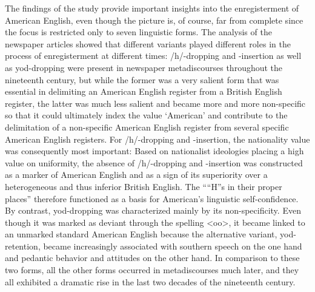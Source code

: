 The findings of the study provide important insights into the enregisterment of American English, even though the picture is, of course, far from complete since the focus is restricted only to seven linguistic forms. The analysis of the newspaper articles showed that different variants played different roles in the process of enregisterment at different times: /h/-dropping and -insertion as well as yod-dropping were present in newspaper metadiscourses throughout the nineteenth century, but while the former was a very salient form that was essential in delimiting an American English register from a British English register, the latter was much less salient and became more and more non-specific so that it could ultimately index the value ‘American’ and contribute to the delimitation of a non-specific American English register from several specific American English registers. For /h/-dropping and -insertion, the nationality value was consequently most important: Based on nationalist ideologies placing a high value on uniformity, the absence of /h/-dropping and -insertion was constructed as a marker of American English and as a sign of its superiority over a heterogeneous and thus inferior British English. The ““H”s in their proper places” therefore functioned as a basis for American’s linguistic self-confidence. By contrast, yod-dropping was characterized mainly by its non-specificity. Even though it was marked as deviant through the spelling <oo>, it became linked to an unmarked standard American English because the alternative variant, yod-retention, became increasingly associated with southern speech on the one hand and pedantic behavior and attitudes on the other hand. In comparison to these two forms, all the other forms occurred in metadiscourses much later, and they all exhibited a dramatic rise in the last two decades of the nineteenth century.

